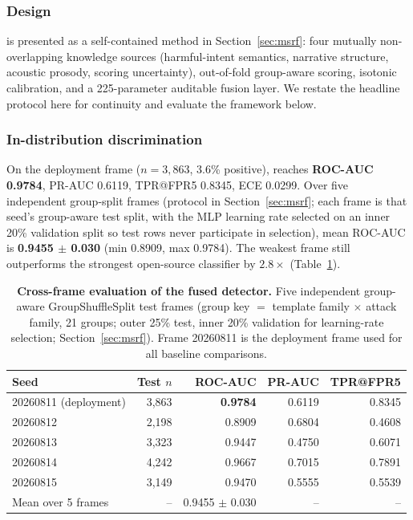 \subsubsection{Design}
\MSRF{} is presented as a self-contained method in
Section~\ref{sec:msrf}: four mutually non-overlapping knowledge sources
(harmful-intent semantics, narrative structure, acoustic prosody, scoring
uncertainty), out-of-fold group-aware scoring, isotonic calibration, and a
225-parameter auditable fusion layer. We restate the headline protocol here
for continuity and evaluate the framework below.

\subsubsection{In-distribution discrimination}
On the deployment frame ($n=3{,}863$, 3.6\% positive), \MSRF{} reaches
\textbf{ROC-AUC 0.9784}, PR-AUC 0.6119, TPR@FPR5 0.8345, ECE 0.0299. Over five
independent group-split frames (protocol in Section~\ref{sec:msrf}; each frame
is that seed's group-aware test split, with the MLP learning rate selected on
an inner 20\% validation split so test rows never participate in selection),
mean ROC-AUC is \textbf{0.9455 $\pm$ 0.030} (min 0.8909, max 0.9784). The
weakest frame still outperforms the strongest open-source classifier by
$2.8\times$ (Table~\ref{tab:frames}).

\begin{table}[t]
\centering
\caption{\textbf{Cross-frame evaluation of the fused detector.} Five
independent group-aware GroupShuffleSplit test frames (group key $=$ template
family $\times$ attack family, 21 groups; outer 25\% test, inner 20\%
validation for learning-rate selection; Section~\ref{sec:msrf}). Frame 20260811
is the deployment frame used for all baseline comparisons.}
\label{tab:frames}
\small
\begin{tabular}{lrrrr}
\toprule
Seed & Test $n$ & ROC-AUC & PR-AUC & TPR@FPR5 \\
\midrule
20260811 (deployment) & 3{,}863 & \textbf{0.9784} & 0.6119 & 0.8345 \\
20260812 & 2{,}198 & 0.8909 & 0.6804 & 0.4608 \\
20260813 & 3{,}323 & 0.9447 & 0.4750 & 0.6071 \\
20260814 & 4{,}242 & 0.9667 & 0.7015 & 0.7891 \\
20260815 & 3{,}149 & 0.9470 & 0.5555 & 0.5539 \\
\midrule
Mean over 5 frames & -- & 0.9455 $\pm$ 0.030 & -- & -- \\
\bottomrule
\end{tabular}
\end{table}

